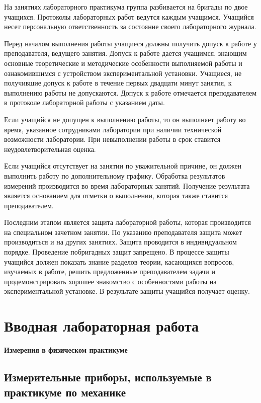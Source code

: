 \documentclass[a4paper, 12pt]{extarticle}
\begin{document}
На занятиях лабораторного практикума группа разбивается на бригады по двое учащихся. Протоколы лабораторных работ ведутся каждым учащимся. Учащийся несет персональную ответственность за состояние своего лабораторного журнала.

Перед началом выполнения работы учащиеся должны получить допуск к работе у преподавателя, ведущего занятия. Допуск к работе дается учащимся, знающим основные теоретические и методические особенности выполняемой работы и ознакомившимся с устройством экспериментальной установки. Учащиеся, не получившие допуск к работе в течение первых двадцати минут занятия, к выполнению работы не допускаются. Допуск к работе отмечается преподавателем в протоколе лабораторной  работы с указанием даты.

 Если учащийся не допущен к выполнению работы, то он выполняет работу во время, указанное сотрудниками лаборатории при наличии технической возможности лаборатории. При невыполнении работы в срок ставится неудовлетворительная оценка.

 Если учащийся отсутствует на занятии по уважительной  причине, он должен выполнить работу по дополнительному графику. Обработка результатов измерений  производится во время лабораторных занятий. Получение результата является основанием для отметки о выполнении, которая также ставится преподавателем.

 Последним этапом является защита лабораторной работы, которая производится на специальном зачетном занятии. По указанию преподавателя защита может производиться и на других занятиях. Защита проводится в индивидуальном порядке. Проведение побригадных защит запрещено. В процессе защиты учащийся должен показать знание разделов теории, касающихся вопросов, изучаемых в работе, решить предложенные преподавателем задачи и продемонстрировать хорошее знакомство с особенностями работы на экспериментальной установке. В результате защиты учащийся получает оценку.

\newpage

\setcounter{section}{0}
\setcounter{subsection}{0}
\setcounter{subsubsection}{0}
\setcounter{figure}{0}
\setcounter{table}{0}
\setcounter{equation}{0}
\section*{Вводная лабораторная работа}

{\huge \textbf{Измерения в физическом практикуме}}

\subsection{Измерительные приборы, используемые в практикуме по механике}
\end{document}
